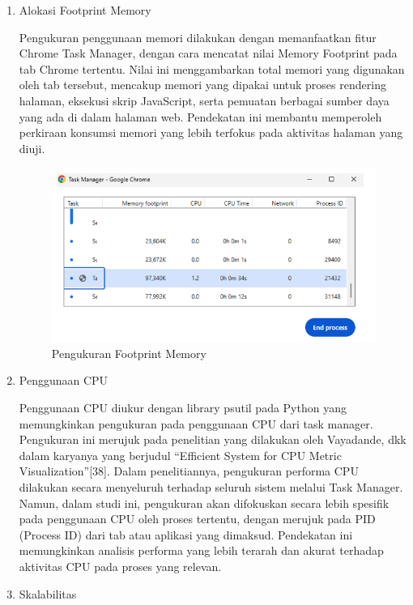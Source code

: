 \begin{enumerate}
	\item Alokasi Footprint Memory 
	
	Pengukuran penggunaan memori dilakukan dengan memanfaatkan fitur Chrome Task Manager, dengan cara mencatat nilai Memory Footprint pada tab Chrome tertentu. Nilai ini menggambarkan total memori yang digunakan oleh tab tersebut, mencakup memori yang dipakai untuk proses rendering halaman, eksekusi skrip JavaScript, serta pemuatan berbagai sumber daya yang ada di dalam halaman web. Pendekatan ini membantu memperoleh perkiraan konsumsi memori yang lebih terfokus pada aktivitas halaman yang diuji.
		\begin{figure}[H]
		\centering
		\includegraphics[width=0.8\linewidth]{gambar/Metodologi/Task Manager.png}
		\caption{Pengukuran Footprint Memory}
		\label{Pengukuran Footprint Memory}
	\end{figure}
	
	\item Penggunaan CPU
	 
	Penggunaan CPU diukur dengan library psutil pada Python yang memungkinkan pengukuran pada penggunaan CPU dari task manager. Pengukuran ini merujuk pada penelitian yang dilakukan oleh Vayadande, dkk dalam karyanya yang berjudul “Efficient System for CPU Metric Visualization”[38]. Dalam penelitiannya, pengukuran performa CPU dilakukan secara menyeluruh terhadap seluruh sistem melalui Task Manager. Namun, dalam studi ini, pengukuran akan difokuskan secara lebih spesifik pada penggunaan CPU oleh proses tertentu, dengan merujuk pada PID (Process ID) dari tab atau aplikasi yang dimaksud. Pendekatan ini memungkinkan analisis performa yang lebih terarah dan akurat terhadap aktivitas CPU pada proses yang relevan.
	
	\item Skalabilitas
	

\end{enumerate}

